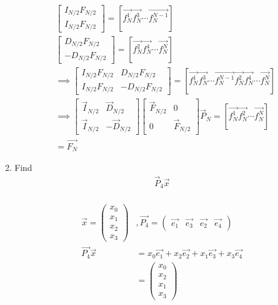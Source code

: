 \documentclass[journal,12pt,twocolumn]{IEEEtran}
\renewcommand\thesection{\arabic{section}}
\begin{document}
\begin{enumerate}[label=\arabic*.,ref=\thesection.\theenumi]
\begin{align}
    &\begin{bmatrix}
    I_{N/2}F_{N/2}\\
    I_{N/2}F_{N/2}
    \end{bmatrix}=[\vec{f_N^1}\vec{f_N^3}\cdots\vec{f_N^{N-1}}]\\
        &\begin{bmatrix}
    D_{N/2}F_{N/2}\\
    -D_{N/2}F_{N/2}
    \end{bmatrix}=[\vec{f_N^2}\vec{f_N^4}\cdots\vec{f_N^{N}}]\\
    &\implies \begin{bmatrix}
    I_{N/2}F_{N/2}& D_{N/2}F_{N/2}\\
    I_{N/2}F_{N/2}&-D_{N/2}F_{N/2}
    \end{bmatrix}=[\vec{f_N^1}\vec{f_N^3}\cdots\vec{f_N^{N-1}}\vec{f_N^2}\vec{f_N^4}\cdots\vec{f_N^{N}}]\\
&\implies \begin{bmatrix}
\vec{I}_{N/2} & \vec{D}_{N/2} \\
\vec{I}_{N/2} & -\vec{D}_{N/2}
\end{bmatrix}
\begin{bmatrix}
\vec{F}_{N/2} & 0 \\
0 & \vec{F}_{N/2}
\end{bmatrix}
\vec{P}_{N}=[\vec{f_N^1}\vec{f_N^2}\cdots\vec{f_N^N}]\\
&= \vec{F_N}
\end{align}
\item Find 
    \begin{align}
	     \vec{P}_4 \vec{x}
    \end{align}\\
    \solution
    \begin{align}
        \vec{x}=\begin{pmatrix}
        x_0\\x_1\\x_2\\x_3
        \end{pmatrix}&, \vec{P_4}=\begin{pmatrix}\vec{e_1}&\vec{e_3}&\vec{e_2}&\vec{e_4}\end{pmatrix}\\
        \vec{P_4}\vec{x}&=x_0\vec{e_1}+x_2\vec{e_2}+x_1\vec{e_3}+x_3\vec{e_4}\\
        &=\begin{pmatrix}
        x_0\\x_2\\x_1\\x_3

\end{pmatrix}
\end{align}
\end{enumerate}
\end{document}
